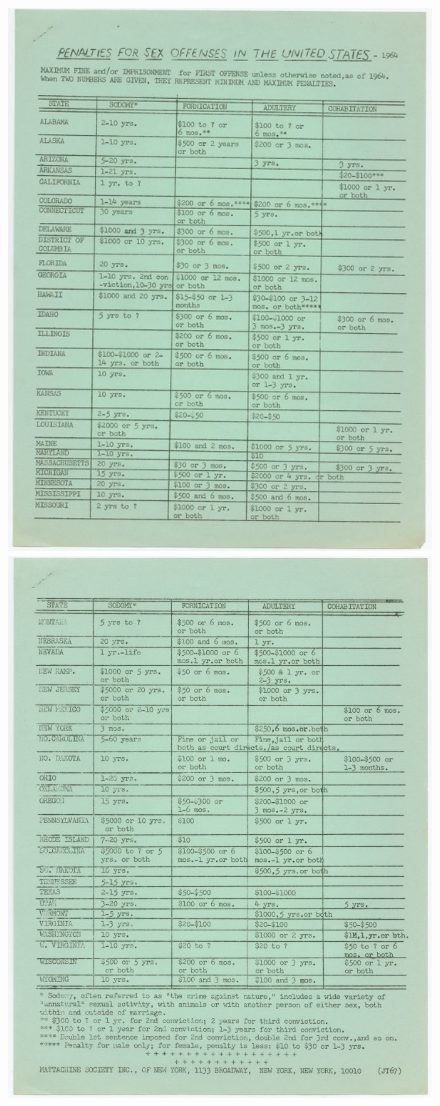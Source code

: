 \begin{figure}[h]
 \centering

 \includegraphics{../PrimarySourceMaterials/MattachineSocietyPamphlet1964-A.jpg}
\includegraphics{../PrimarySourceMaterials/MattachineSocietyPamphlet1964-B.jpg}

\end{figure}
